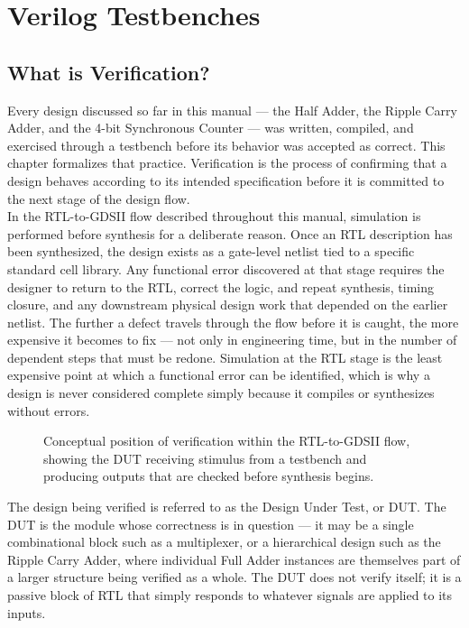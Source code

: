 \chapter{Verilog Testbenches}

\section{What is Verification?}
Every design discussed so far in this manual — the Half Adder, the Ripple Carry Adder, and the 4-bit Synchronous Counter — was written, compiled, and exercised through a testbench before its behavior was accepted as correct. This chapter formalizes that practice. Verification is the process of confirming that a design behaves according to its intended specification before it is committed to the next stage of the design flow. \\


\noindent In the RTL-to-GDSII flow described throughout this manual, simulation is performed before synthesis for a deliberate reason. Once an RTL description has been synthesized, the design exists as a gate-level netlist tied to a specific standard cell library. Any functional error discovered at that stage requires the designer to return to the RTL, correct the logic, and repeat synthesis, timing closure, and any downstream physical design work that depended on the earlier netlist. The further a defect travels through the flow before it is caught, the more expensive it becomes to fix — not only in engineering time, but in the number of dependent steps that must be redone. Simulation at the RTL stage is the least expensive point at which a functional error can be identified, which is why a design is never considered complete simply because it compiles or synthesizes without errors. \\

\begin{figure}[H]
    \centering
    \caption{Conceptual position of verification within the RTL-to-GDSII flow, showing the DUT receiving stimulus from a testbench and producing outputs that are checked before synthesis begins.}
    \label{fig:verification}
\end{figure}

\noindent The design being verified is referred to as the Design Under Test, or DUT. The DUT is the module whose correctness is in question — it may be a single combinational block such as a multiplexer, or a hierarchical design such as the Ripple Carry Adder, where individual Full Adder instances are themselves part of a larger structure being verified as a whole. The DUT does not verify itself; it is a passive block of RTL that simply responds to whatever signals are applied to its inputs.\\


